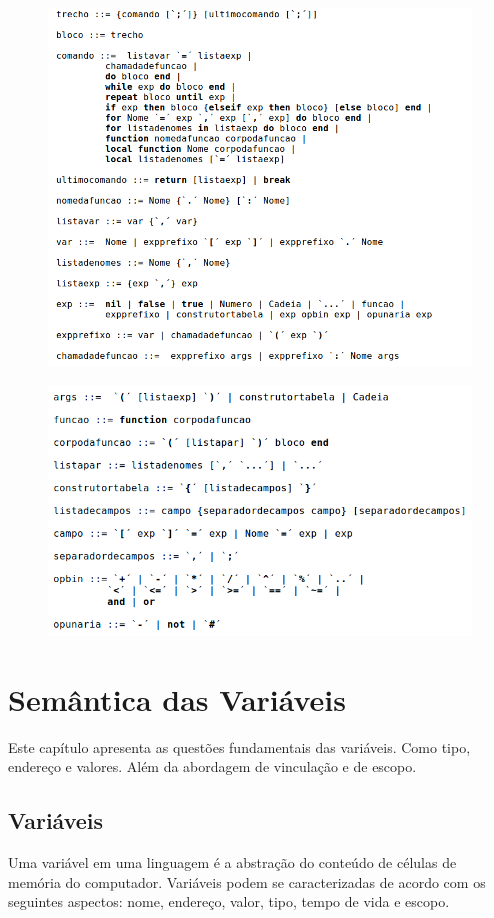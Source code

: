 \documentclass[
12pt, %
openright, %
oneside, %
a4paper, %
english, %
brazil, %
]{abntex2}
\begin{document}
\begin{figure}[H]
\centering
\includegraphics[width=0.9\linewidth]{imagens/sintaxe1.png}
\end{figure}

\begin{figure}[H]
\centering
\includegraphics[width=0.9\linewidth]{imagens/sintaxe2.png}
\end{figure}


\chapter{Semântica das Variáveis}
Este capítulo apresenta as questões fundamentais das variáveis. Como tipo, endereço e valores. Além da abordagem de vinculação e de escopo.

\section{Variáveis}
Uma variável em uma linguagem é a abstração do conteúdo de células de memória do computador. Variáveis podem se caracterizadas de acordo com os seguintes aspectos: nome, endereço, valor, tipo, tempo de vida e escopo.
\end{document}

